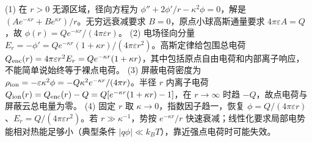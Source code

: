 (1) 在 \(r>0\) 无源区域，径向方程为 \(\phi''+2\phi'/r-\kappa^2\phi=0\)，解是 \((Ae^{-\kappa r}+Be^{\kappa r})/r\)。无穷远衰减要求 \(B=0\)，原点小球高斯通量要求 \(4\pi\varepsilon A=Q\)，故 \(\phi(r)=Qe^{-\kappa r}/(4\pi\varepsilon r)\)。
(2) 电场径向分量 \(E_r=-\phi'=Qe^{-\kappa r}(1+\kappa r)/(4\pi\varepsilon r^2)\)。高斯定律给包围总电荷 \(Q_{\rm enc}(r)=4\pi\varepsilon r^2 E_r=Qe^{-\kappa r}(1+\kappa r)\)，其中包括原点自由电荷和内部离子响应，不能简单说始终等于裸点电荷。
(3) 屏蔽电荷密度为 \(\rho_{\rm ion}=-\varepsilon\kappa^2\phi=-Q\kappa^2e^{-\kappa r}/(4\pi r)\)。半径 \(r\) 内离子电荷 \(Q_{\rm ion}(r)=Q_{\rm enc}(r)-Q=Q[e^{-\kappa r}(1+\kappa r)-1]\)，在 \(r\to\infty\) 时趋 \(-Q\)，故点电荷与屏蔽云总电量为零。
(4) 固定 \(r\) 取 \(\kappa\to0\)，指数因子趋一，恢复 \(\phi=Q/(4\pi\varepsilon r)\)、\(E_r=Q/(4\pi\varepsilon r^2)\)。若 \(r\gg\kappa^{-1}\)，势按 \(e^{-\kappa r}/r\) 快速衰减；线性化要求局部电势能相对热能足够小（典型条件 \(|q\phi|\ll k_BT\)），靠近强点电荷时可能失效。
